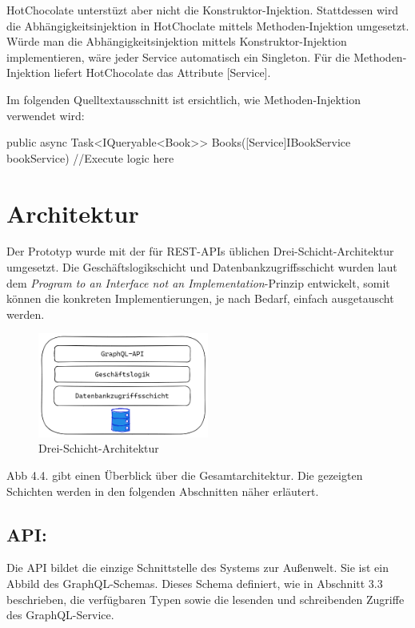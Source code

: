 HotChocolate unterstüzt aber nicht die Konstruktor-Injektion.
Stattdessen wird die Abhängigkeitsinjektion in HotChoclate mittels Methoden-Injektion umgesetzt.
Würde man die Abhängigkeitsinjektion mittels Konstruktor-Injektion implementieren, wäre jeder Service automatisch ein Singleton.
Für die Methoden-Injektion liefert HotChocolate das Attribute [Service].

Im folgenden Quelltextausschnitt ist ersichtlich, wie Methoden-Injektion verwendet wird:
\begin{JsCode}
public async Task<IQueryable<Book>> Books([Service]IBookService bookService)
{
    //Execute logic here
}
\end{JsCode}

\section{Architektur}
Der Prototyp wurde mit der für REST-APIs üblichen Drei-Schicht-Architektur umgesetzt.
Die Geschäftslogikschicht und Datenbankzugriffsschicht wurden laut dem \textit{Program to an Interface not an Implementation}-Prinzip entwickelt, somit können die konkreten Implementierungen, je nach Bedarf, einfach ausgetauscht werden.
\newline

\begin{figure}[H]
    \centering
    \includegraphics[width=0.5\textwidth]{pics/architecture.png}
    \caption{Drei-Schicht-Architektur}
\end{figure}

Abb 4.4. gibt einen Überblick über die Gesamtarchitektur.
Die gezeigten Schichten werden in den folgenden Abschnitten näher erläutert.

\subsection{API:}
Die API bildet die einzige Schnittstelle des Systems zur Außenwelt.
Sie ist ein Abbild des GraphQL-Schemas.
Dieses Schema definiert, wie in Abschnitt 3.3 beschrieben, die verfügbaren Typen sowie die lesenden und schreibenden Zugriffe des GraphQL-Service.

